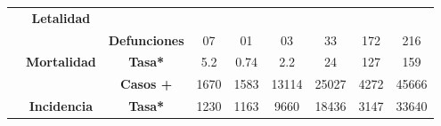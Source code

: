 \begin{tabular}{ccc|cccccc|}
		&\multicolumn{1}{c|}{\multirow{-2}{*}{\cellcolor[HTML]{E2EFDA}\textbf{Letalidad}}}&\cellcolor[HTML]{E2EFDA} 
		&\multicolumn{1}{c|}{\cellcolor[HTML]{E2EFDA}} 
		&\multicolumn{1}{c|}{\cellcolor[HTML]{E2EFDA}} 
		&\multicolumn{1}{c|}{\cellcolor[HTML]{E2EFDA}} 
		&\multicolumn{1}{c|}{\cellcolor[HTML]{E2EFDA}} 
		&\multicolumn{1}{c|}{\cellcolor[HTML]{E2EFDA}} 
		&\cellcolor[HTML]{E2EFDA} \\ \cline{2-2}
		\rowcolor[HTML]{E2EFDA} 
		\multicolumn{1}{|c|}{\cellcolor[HTML]{E2EFDA}} 
		&\multicolumn{1}{c|}{\cellcolor[HTML]{E2EFDA}} 
		&\multirow{-2}{*}{\cellcolor[HTML]{E2EFDA}\textbf{Defunciones}} 
		&\multicolumn{1}{c|}{\multirow{-2}{*}{\cellcolor[HTML]{E2EFDA}07}} 
		&\multicolumn{1}{c|}{\multirow{-2}{*}{\cellcolor[HTML]{E2EFDA}01}} 
		&\multicolumn{1}{c|}{\multirow{-2}{*}{\cellcolor[HTML]{E2EFDA}03}} 
		&\multicolumn{1}{c|}{\multirow{-2}{*}{\cellcolor[HTML]{E2EFDA}33}} 
		&\multicolumn{1}{c|}{\multirow{-2}{*}{\cellcolor[HTML]{E2EFDA}172}} 
		&\multirow{-2}{*}{\cellcolor[HTML]{E2EFDA}216} \\ \cline{3-9} 
		\rowcolor[HTML]{E2EFDA} 
		\multicolumn{1}{|c|}{\cellcolor[HTML]{E2EFDA}} &
		\multicolumn{1}{c|}{\multirow{-2}{*}{\cellcolor[HTML]{E2EFDA}\textbf{Mortalidad}}}&\textbf{Tasa*} 
		&\multicolumn{1}{c|}{\cellcolor[HTML]{E2EFDA}5.2} 
		&\multicolumn{1}{c|}{\cellcolor[HTML]{E2EFDA}0.74} 
		&\multicolumn{1}{c|}{\cellcolor[HTML]{E2EFDA}2.2} 
		&\multicolumn{1}{c|}{\cellcolor[HTML]{E2EFDA}24} 
		&\multicolumn{1}{c|}{\cellcolor[HTML]{E2EFDA}127} 
		&159 \\ \cline{2-9} 
		\rowcolor[HTML]{E2EFDA} 
		\multicolumn{1}{|c|}{\cellcolor[HTML]{E2EFDA}} &
		\multicolumn{1}{c|}{\cellcolor[HTML]{E2EFDA}} &
		\textbf{Casos +} &
		\multicolumn{1}{c|}{\cellcolor[HTML]{E2EFDA}1670} &
		\multicolumn{1}{c|}{\cellcolor[HTML]{E2EFDA}1583} &
		\multicolumn{1}{c|}{\cellcolor[HTML]{E2EFDA}13114} &
		\multicolumn{1}{c|}{\cellcolor[HTML]{E2EFDA}25027} &
		\multicolumn{1}{c|}{\cellcolor[HTML]{E2EFDA}4272} &
		45666 \\ \cline{3-9} 
		\rowcolor[HTML]{E2EFDA} 
		\multicolumn{1}{|c|}{\multirow{-6}{*}{\cellcolor[HTML]{E2EFDA}\textbf{2022}}} &
		\multicolumn{1}{c|}{\multirow{-2}{*}{\cellcolor[HTML]{E2EFDA}\textbf{Incidencia}}} &
		\textbf{Tasa*} &
		\multicolumn{1}{c|}{\cellcolor[HTML]{E2EFDA}1230} &
		\multicolumn{1}{c|}{\cellcolor[HTML]{E2EFDA}1163} &
		\multicolumn{1}{c|}{\cellcolor[HTML]{E2EFDA}9660} &
		\multicolumn{1}{c|}{\cellcolor[HTML]{E2EFDA}18436} &
		\multicolumn{1}{c|}{\cellcolor[HTML]{E2EFDA}3147} &
		33640 \\ \hline
	\end{tabular}
